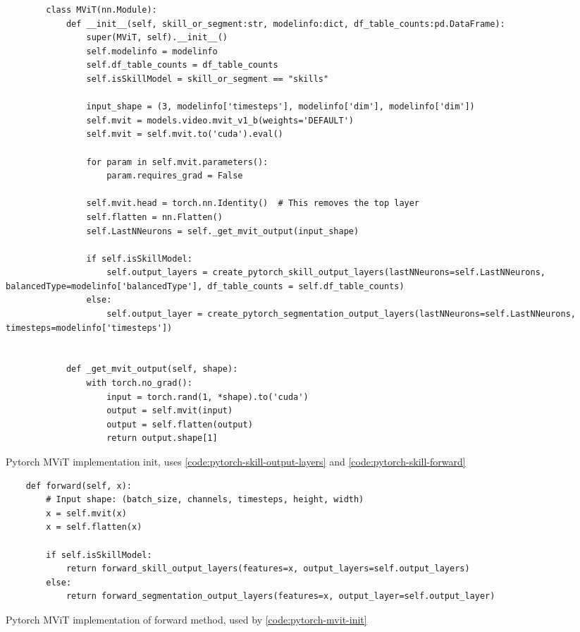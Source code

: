 \begin{listing}
    \begin{verbatim}
        class MViT(nn.Module):
            def __init__(self, skill_or_segment:str, modelinfo:dict, df_table_counts:pd.DataFrame):
                super(MViT, self).__init__()
                self.modelinfo = modelinfo
                self.df_table_counts = df_table_counts
                self.isSkillModel = skill_or_segment == "skills"
                
                input_shape = (3, modelinfo['timesteps'], modelinfo['dim'], modelinfo['dim'])
                self.mvit = models.video.mvit_v1_b(weights='DEFAULT')
                self.mvit = self.mvit.to('cuda').eval()

                for param in self.mvit.parameters():
                    param.requires_grad = False

                self.mvit.head = torch.nn.Identity()  # This removes the top layer
                self.flatten = nn.Flatten()
                self.LastNNeurons = self._get_mvit_output(input_shape)
                
                if self.isSkillModel:
                    self.output_layers = create_pytorch_skill_output_layers(lastNNeurons=self.LastNNeurons, balancedType=modelinfo['balancedType'], df_table_counts = self.df_table_counts)
                else:
                    self.output_layer = create_pytorch_segmentation_output_layers(lastNNeurons=self.LastNNeurons, timesteps=modelinfo['timesteps'])

                
            def _get_mvit_output(self, shape):
                with torch.no_grad():
                    input = torch.rand(1, *shape).to('cuda')
                    output = self.mvit(input)
                    output = self.flatten(output)
                    return output.shape[1]
    \end{verbatim}
    \caption[Pytorch MViT implementation init]{Pytorch MViT implementation init, uses \ref{code:pytorch-skill-output-layers} and \ref{code:pytorch-skill-forward}}
    \label{code:pytorch-mvit-init}
\end{listing}

\begin{listing}
    \begin{verbatim}
    def forward(self, x):
        # Input shape: (batch_size, channels, timesteps, height, width)
        x = self.mvit(x)
        x = self.flatten(x)
        
        if self.isSkillModel:
            return forward_skill_output_layers(features=x, output_layers=self.output_layers)
        else:
            return forward_segmentation_output_layers(features=x, output_layer=self.output_layer)
    \end{verbatim}
    \caption[Pytorch MViT forward]{Pytorch MViT implementation of forward method, used by \ref{code:pytorch-mvit-init}}
    \label{code:pytorch-skill-forward}
\end{listing}



